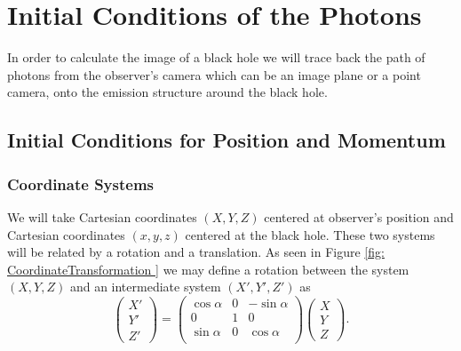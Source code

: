 
\chapter{Initial Conditions of the Photons}

In order to calculate the image of a black hole we will trace back the path of photons from the observer's camera which can be an image plane or a point camera, onto the emission structure around the black hole. \\

\section{Initial Conditions for Position and Momentum}
\subsection{Coordinate Systems}
We will take Cartesian coordinates $(X,Y,Z)$ centered at  observer's position and Cartesian coordinates $(x,y,z)$ centered at the black hole. These two systems will be related by a rotation and a translation. As seen in Figure \ref{fig: CoordinateTransformation } we may define a rotation between the system $(X,Y,Z)$ and an intermediate system $(X',Y',Z')$ as
\begin{equation}
\begin{pmatrix}
X' \\
Y' \\
Z'
\end{pmatrix} =
\begin{pmatrix}
\cos \alpha & 0 &-\sin\alpha \\
0 & 1 &0\\
\sin \alpha &  0 & \cos \alpha\\
\end{pmatrix} 
\begin{pmatrix}
X\\
Y\\
Z
\end{pmatrix}.
\end{equation}

